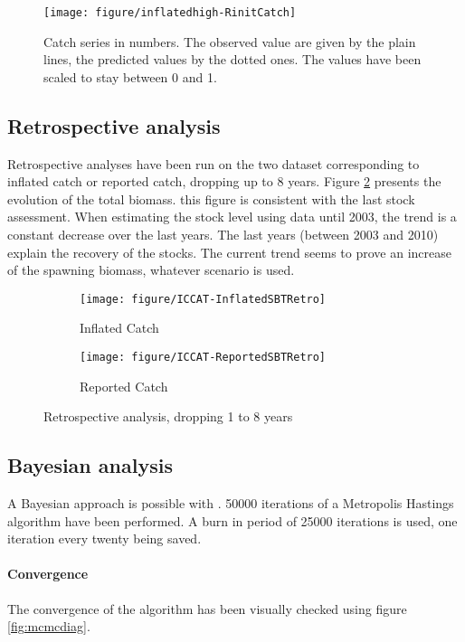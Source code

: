 \begin{figure}[htbp]
  \texttt{[image: figure/inflatedhigh-RinitCatch]} 
  \caption{Catch series in numbers. The observed value are given by the plain lines, the predicted values by the dotted ones. The values have been scaled to stay between 0 and 1.}
  \label{fig:catch}
\end{figure}







\subsection{Retrospective analysis}
Retrospective analyses have been run on the two dataset corresponding to inflated catch or reported catch, dropping up to 8 years. Figure \ref{fig:RetroAnalysis}
 presents the evolution of the total biomass. this figure is consistent with the last stock assessment.
 When estimating the stock level using data until 2003, the trend is a constant decrease over the last years. 
 The last years (between 2003 and 2010) explain the recovery of the stocks. 
 The current trend seems to prove an increase of the spawning biomass, whatever scenario is used.

\begin{figure}[htbp]
 \begin{subfigure}[b]{\textwidth}
  \texttt{[image: figure/ICCAT-InflatedSBTRetro]} 
  \caption{Inflated Catch}
  \end{subfigure}
 \begin{subfigure}[b]{\textwidth}
  \texttt{[image: figure/ICCAT-ReportedSBTRetro]} 
	\caption{Reported Catch}
  \end{subfigure}
\caption{Retrospective analysis, dropping 1 to 8 years}
\label{fig:RetroAnalysis}
\end{figure}



\subsection{Bayesian analysis}
A Bayesian approach is possible with \iscam. 50000 iterations of a Metropolis Hastings algorithm have been performed. 
A burn in period of 25000 iterations is used, one iteration every twenty being saved.  
\paragraph{Convergence}
The convergence of the algorithm has been  visually checked using figure \ref{fig:mcmcdiag}. 

